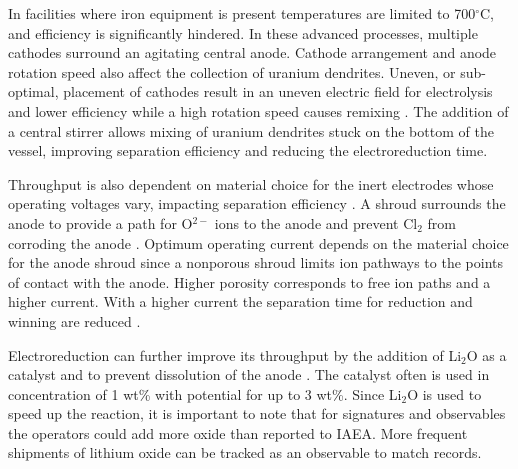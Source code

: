 \documentclass{anstrans}
\begin{document}
In facilities where iron equipment is present temperatures are limited to 700$^{\circ}$C, and efficiency is significantly hindered. In these advanced processes, multiple cathodes surround an agitating central anode. Cathode arrangement and anode rotation speed also affect the collection of uranium dendrites. Uneven, or sub-optimal, placement of cathodes result in an uneven electric field for electrolysis and lower efficiency while a high rotation speed causes remixing \cite{lee_advanced_nodate}. The addition of a central stirrer allows mixing of uranium dendrites stuck on the bottom of the vessel, improving separation efficiency and reducing the electroreduction time. 

Throughput is also dependent on material choice for the inert electrodes whose operating voltages vary, impacting separation efficiency \cite{koyama_development_2012}. A shroud surrounds the anode to provide a path for O$^{2-}$ ions to the anode and prevent Cl$_2$ from corroding the anode \cite{kim_development_2013,choi_electrochemical_2015}. Optimum operating current depends on the material choice for the anode shroud since a nonporous shroud limits ion pathways to the points of contact with the anode. Higher porosity corresponds to free ion paths and a higher current. With a higher current the separation time for reduction and winning are reduced \cite{choi_electrochemical_2015}. 


Electroreduction can further improve its throughput by the addition of Li$_2$O as a catalyst and to prevent dissolution of the anode \cite{choi_electrochemical_2015}. The catalyst often is used in concentration of 1 wt\% with potential for up to 3 wt\%. Since Li$_2$O is used to speed up the reaction, it is important to note that for signatures and observables the operators could add more oxide than reported to IAEA. More frequent shipments of lithium oxide can be tracked as an observable to match records.
\end{document}
